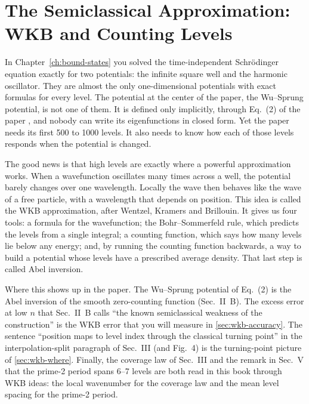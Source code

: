 \chapter{The Semiclassical Approximation: WKB and Counting Levels}\label{ch:wkb}

\begin{chapterintro}
In Chapter~\ref{ch:bound-states} you solved the time-independent Schr\"odinger equation exactly for two potentials: the infinite square well and the harmonic oscillator. They are almost the only one-dimensional potentials with exact formulas for every level. The potential at the center of the paper, the Wu--Sprung potential, is not one of them. It is defined only implicitly, through Eq.~(2) of the paper \cite{soniR1}, and nobody can write its eigenfunctions in closed form. Yet the paper needs its first 500 to 1000 levels. It also needs to know how each of those levels responds when the potential is changed.

The good news is that high levels are exactly where a powerful approximation works. When a wavefunction oscillates many times across a well, the potential barely changes over one wavelength. Locally the wave then behaves like the wave of a free particle, with a wavelength that depends on position. This idea is called the WKB approximation, after Wentzel, Kramers and Brillouin. It gives us four tools: a formula for the wavefunction; the Bohr--Sommerfeld rule, which predicts the levels from a single integral; a counting function, which says how many levels lie below any energy; and, by running the counting function backwards, a way to build a potential whose levels have a prescribed average density. That last step is called Abel inversion.

Where this shows up in the paper. The Wu--Sprung potential of Eq.~(2) is the Abel inversion of the smooth zero-counting function (Sec.~II~B). The excess error at low $n$ that Sec.~II~B calls ``the known semiclassical weakness of the construction'' is the WKB error that you will measure in \cref{sec:wkb-accuracy}. The sentence ``position maps to level index through the classical turning point'' in the interpolation-split paragraph of Sec.~III (and Fig.~4) is the turning-point picture of \cref{sec:wkb-where}. Finally, the coverage law of Sec.~III and the remark in Sec.~V that the prime-2 period spans 6--7 levels are both read in this book through WKB ideas: the local wavenumber for the coverage law and the mean level spacing for the prime-2 period.
\end{chapterintro}


